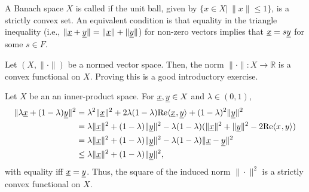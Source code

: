 \begin{definition}
A Banach space $X$ is called  if the unit ball,  given by $\{ x\in X | \, \| x \| \leq 1 \}$, is a strictly convex set.
An equivalent condition is that equality in the triangle inequality (i.e., $\| \underline{x} + \underline{y} \| = \| \underline{x} \| + \| \underline{y} \|$) for non-zero vectors implies that $ \underline{x} = s \underline{y} $ for some $s\in F$.
\end{definition}

\begin{example}
Let $(X,\|\cdot\|)$ be a normed vector space.
Then, the norm $\| \cdot \| \colon X \rightarrow \mathbb{R}$ is a convex functional on $X$.
Proving this is a good introductory exercise.
\end{example}

\begin{example}
Let $X$ be an an inner-product space. For $\underline{x},\underline{y} \in X$ and $\lambda \in (0,1)$,
\begin{align*}
\|\lambda \underline x + (1-\lambda) \underline y \|^2
&= \lambda^2 \| \underline x\|^2 + 2\lambda(1-\lambda) \mathrm{Re} {\langle  \underline x  \mskip1mu ,   \underline y  \rangle} + (1-\lambda)^2 \|\underline y\|^2 \\
&= \lambda \| \underline x\|^2 + (1-\lambda)\|\underline y\|^2 - \lambda (1-\lambda) (\|\underline x\|^2+\|\underline y\|^2-2 \mathrm{Re} {\langle  x  \mskip1mu ,  y  \rangle})\\
&= \lambda \| \underline x\|^2 + (1-\lambda)\|\underline y\|^2 - \lambda (1-\lambda) \|\underline x - \underline y\|^2 \\
&\leq \lambda \| \underline x\|^2 + (1-\lambda)\|\underline y\|^2,
\end{align*}
with equality iff $\underline{x}=\underline{y}$.
Thus, the square of the induced norm $\| \cdot \|^2$ is a strictly convex functional on $X$.
\end{example}

